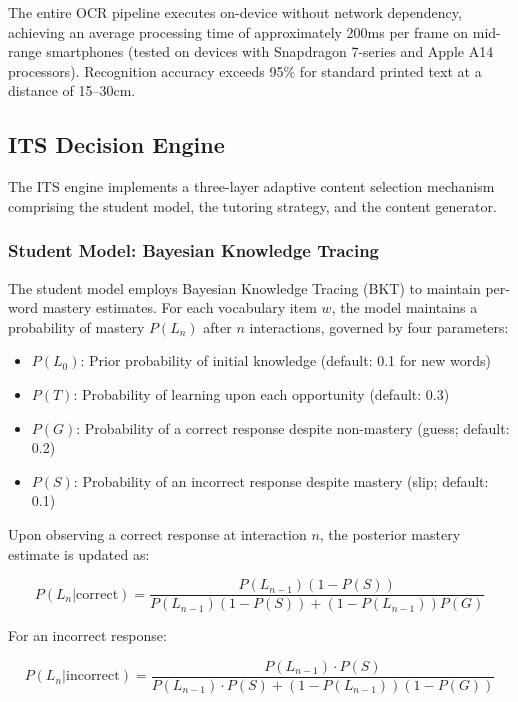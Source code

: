 The entire OCR pipeline executes on-device without network dependency, achieving an average processing time of approximately 200ms per frame on mid-range smartphones (tested on devices with Snapdragon 7-series and Apple A14 processors). Recognition accuracy exceeds 95\% for standard printed text at a distance of 15--30cm.

\subsection{ITS Decision Engine}
\label{subsec:its_engine}

The ITS engine implements a three-layer adaptive content selection mechanism comprising the student model, the tutoring strategy, and the content generator.

\subsubsection{Student Model: Bayesian Knowledge Tracing}

The student model employs Bayesian Knowledge Tracing (BKT) \cite{corbett1994} to maintain per-word mastery estimates. For each vocabulary item $w$, the model maintains a probability of mastery $P(L_n)$ after $n$ interactions, governed by four parameters:

\begin{itemize}
    \item $P(L_0)$: Prior probability of initial knowledge (default: 0.1 for new words)
    \item $P(T)$: Probability of learning upon each opportunity (default: 0.3)
    \item $P(G)$: Probability of a correct response despite non-mastery (guess; default: 0.2)
    \item $P(S)$: Probability of an incorrect response despite mastery (slip; default: 0.1)
\end{itemize}

Upon observing a correct response at interaction $n$, the posterior mastery estimate is updated as:

\begin{equation}
P(L_n | \text{correct}) = \frac{P(L_{n-1})(1 - P(S))}{P(L_{n-1})(1 - P(S)) + (1 - P(L_{n-1}))P(G)}
\label{eq:bkt_correct}
\end{equation}

For an incorrect response:

\begin{equation}
P(L_n | \text{incorrect}) = \frac{P(L_{n-1}) \cdot P(S)}{P(L_{n-1}) \cdot P(S) + (1 - P(L_{n-1}))(1 - P(G))}
\label{eq:bkt_incorrect}
\end{equation}

